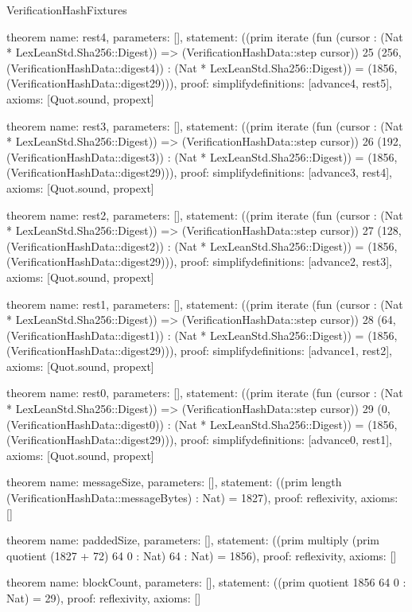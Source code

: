\begin{lexlean}{VerificationHashFixtures}
\begin{semanticmodule}
theorem{
  name: rest4,
  parameters: [],
  statement: ((prim iterate (fun (cursor : (Nat * LexLeanStd.Sha256::Digest)) => (VerificationHashData::step cursor)) 25 (256, (VerificationHashData::digest4)) : (Nat * LexLeanStd.Sha256::Digest)) = (1856, (VerificationHashData::digest29))),
  proof: simplify{definitions: [advance4, rest5]},
  axioms: [Quot.sound, propext]
}

theorem{
  name: rest3,
  parameters: [],
  statement: ((prim iterate (fun (cursor : (Nat * LexLeanStd.Sha256::Digest)) => (VerificationHashData::step cursor)) 26 (192, (VerificationHashData::digest3)) : (Nat * LexLeanStd.Sha256::Digest)) = (1856, (VerificationHashData::digest29))),
  proof: simplify{definitions: [advance3, rest4]},
  axioms: [Quot.sound, propext]
}

theorem{
  name: rest2,
  parameters: [],
  statement: ((prim iterate (fun (cursor : (Nat * LexLeanStd.Sha256::Digest)) => (VerificationHashData::step cursor)) 27 (128, (VerificationHashData::digest2)) : (Nat * LexLeanStd.Sha256::Digest)) = (1856, (VerificationHashData::digest29))),
  proof: simplify{definitions: [advance2, rest3]},
  axioms: [Quot.sound, propext]
}

theorem{
  name: rest1,
  parameters: [],
  statement: ((prim iterate (fun (cursor : (Nat * LexLeanStd.Sha256::Digest)) => (VerificationHashData::step cursor)) 28 (64, (VerificationHashData::digest1)) : (Nat * LexLeanStd.Sha256::Digest)) = (1856, (VerificationHashData::digest29))),
  proof: simplify{definitions: [advance1, rest2]},
  axioms: [Quot.sound, propext]
}

theorem{
  name: rest0,
  parameters: [],
  statement: ((prim iterate (fun (cursor : (Nat * LexLeanStd.Sha256::Digest)) => (VerificationHashData::step cursor)) 29 (0, (VerificationHashData::digest0)) : (Nat * LexLeanStd.Sha256::Digest)) = (1856, (VerificationHashData::digest29))),
  proof: simplify{definitions: [advance0, rest1]},
  axioms: [Quot.sound, propext]
}

theorem{
  name: messageSize,
  parameters: [],
  statement: ((prim length (VerificationHashData::messageBytes) : Nat) = 1827),
  proof: reflexivity{},
  axioms: []
}

theorem{
  name: paddedSize,
  parameters: [],
  statement: ((prim multiply (prim quotient (1827 + 72) 64 0 : Nat) 64 : Nat) = 1856),
  proof: reflexivity{},
  axioms: []
}

theorem{
  name: blockCount,
  parameters: [],
  statement: ((prim quotient 1856 64 0 : Nat) = 29),
  proof: reflexivity{},
  axioms: []
}


\end{semanticmodule}
\end{lexlean}

